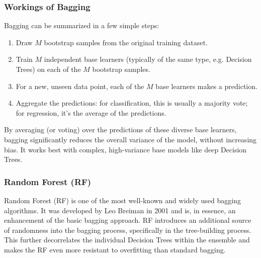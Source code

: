 \subsubsection{Workings of Bagging} 
Bagging can be summarized in a few simple steps:
\begin{enumerate}[noitemsep] 
\item Draw $M$ bootstrap samples from the original training dataset.
\item Train $M$ independent base learners (typically of the same type, e.g. Decision Trees) on each of the $M$ bootstrap samples.
\item For a new, unseen data point, each of the $M$ base learners makes a prediction.
\item Aggregate the predictions: for classification, this is usually a majority vote; for regression, it's the average of the predictions.
\end{enumerate} 
By averaging (or voting) over the predictions of these diverse base learners, bagging significantly reduces the overall variance of the model, without increasing bias. It works best with complex, high-variance base models like deep Decision Trees.

\subsubsection{Random Forest (RF)} 
Random Forest (RF) is one of the most well-known and widely used bagging algorithms. It was developed by Leo Breiman in 2001 and is, in essence, an enhancement of the basic bagging approach. RF introduces an additional source of randomness into the bagging process, specifically in the tree-building process. This further decorrelates the individual Decision Trees within the ensemble and makes the RF even more resistant to overfitting than standard bagging.

